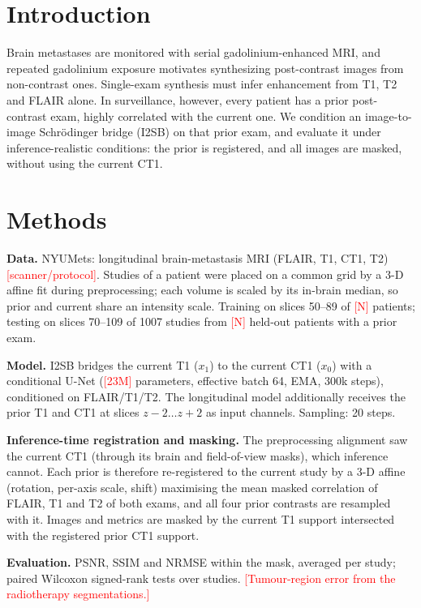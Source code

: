 \documentclass[10pt]{article}
\newcommand{\todo}[1]{\textcolor{red}{[#1]}}
\begin{document}
\section*{Introduction}
Brain metastases are monitored with serial gadolinium-enhanced MRI\cite{ref_rano}, and repeated
gadolinium exposure motivates synthesizing post-contrast images from non-contrast
ones\cite{ref_synth}. Single-exam synthesis must infer enhancement from T1, T2 and FLAIR alone.
In surveillance, however, every patient has a prior post-contrast exam, highly correlated with
the current one. We condition an image-to-image Schr\"odinger bridge (I2SB)\cite{ref_i2sb} on
that prior exam, and evaluate it under inference-realistic conditions: the prior is registered,
and all images are masked, without using the current CT1.

\section*{Methods}
\textbf{Data.} NYUMets\cite{ref_nyumets}: longitudinal brain-metastasis MRI (FLAIR, T1, CT1, T2)
\todo{scanner/protocol}. Studies of a patient were placed on a common grid by a 3-D affine fit
during preprocessing; each volume is scaled by its in-brain median, so prior and current share an
intensity scale. Training on slices 50--89 of \todo{N} patients; testing on slices 70--109 of
1007 studies from \todo{N} held-out patients with a prior exam.

\textbf{Model.} I2SB bridges the current T1 ($x_1$) to the current CT1 ($x_0$) with a
conditional U-Net (\todo{23M} parameters, effective batch 64, EMA, 300k steps), conditioned on
FLAIR/T1/T2. The longitudinal model additionally receives the prior T1 and CT1 at slices
$z\!-\!2\ldots z\!+\!2$ as input channels. Sampling: 20 steps.

\textbf{Inference-time registration and masking.} The preprocessing alignment saw the current
CT1 (through its brain and field-of-view masks), which inference cannot. Each prior is therefore
re-registered to the current study by a 3-D affine (rotation, per-axis scale, shift) maximising
the mean masked correlation of FLAIR, T1 and T2 of both exams, and all four prior contrasts are
resampled with it. Images and metrics are masked by the current T1 support intersected with the
registered prior CT1 support.

\textbf{Evaluation.} PSNR, SSIM and NRMSE within the mask, averaged per study; paired Wilcoxon
signed-rank tests over studies. \todo{Tumour-region error from the radiotherapy segmentations.}
\end{document}

